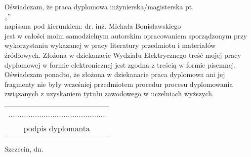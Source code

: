 \thispagestyle{empty}


Oświadczam, że praca dyplomowa inżynierska/magisterska pt. \\
 „\paperTitlePl” \\
napisana pod kierunkiem: dr. inż. Michała Bonisławskiego \\
jest w całości moim samodzielnym autorskim opracowaniem sporządzonym przy wykorzystaniu wykazanej w pracy literatury przedmiotu i materiałów źródłowych.
Złożona w dziekanacie Wydziału Elektrycznego treść mojej pracy dyplomowej w formie elektronicznej jest zgodna z treścią w formie pisemnej. \\

Oświadczam ponadto, że złożona w dziekanacie praca dyplomowa ani jej fragmenty nie
były wcześniej przedmiotem procedur procesu dyplomowania związanych z uzyskaniem
tytułu zawodowego w uczelniach wyższych.
\vspace{30mm}


\begin{flushright}
	\begin{tabular}{c}
  		............................................\\
  		podpis dyplomanta
	\end{tabular}
\end{flushright}

\vspace{5mm}

\begin{flushleft}
	Szczecin, dn. \topicAcceptationDate{}
\end{flushleft}


\clearpage
